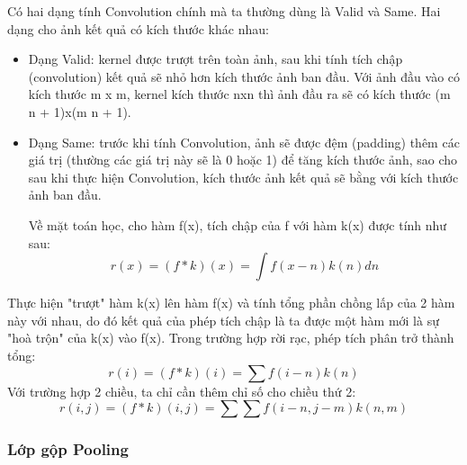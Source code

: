 Có hai dạng tính Convolution chính mà ta thường dùng là Valid và Same. Hai dạng cho ảnh kết quả có kích thước khác nhau:
\begin{itemize}
\item Dạng Valid: kernel được trượt trên toàn ảnh, sau khi tính tích chập (convolution) kết quả sẽ nhỏ hơn kích thước ảnh ban đầu. Với ảnh đầu vào có kích thước m x m, kernel kích thước nxn thì ảnh đầu ra sẽ có kích thước (m n + 1)x(m n + 1).
\item Dạng Same: trước khi tính Convolution,  ảnh sẽ được đệm (padding) thêm các giá trị (thường các giá trị này sẽ là 0 hoặc 1) để tăng kích thước ảnh, sao cho sau khi thực hiện Convolution, kích thước ảnh kết quả sẽ bằng với kích thước ảnh ban đầu.

Về mặt toán học, cho hàm f(x), tích chập của f với hàm k(x) được tính như sau:
\begin{equation}
r(x) = (f*k)(x) =\int f(x - n)k(n) dn
\end{equation}
\end{itemize}

Thực hiện "trượt" hàm k(x) lên hàm f(x) và tính tổng phần chồng lấp của 2 hàm này với nhau, do đó kết quả của phép tích chập là ta được một hàm mới là sự "hoà trộn" của k(x) vào f(x). Trong trường hợp rời rạc, phép tích phân trở thành tổng:
\begin{equation}
r(i) = (f*k)(i) =\sum f(i - n)k(n)
\end{equation}
Với trường hợp 2 chiều, ta chỉ cần thêm chỉ số cho chiều thứ 2:
\begin{equation}
r(i, j) = (f*k)(i, j) =\sum\sum f(i - n, j- m)k(n, m)
\end{equation}
\subsubsection{Lớp gộp Pooling}

